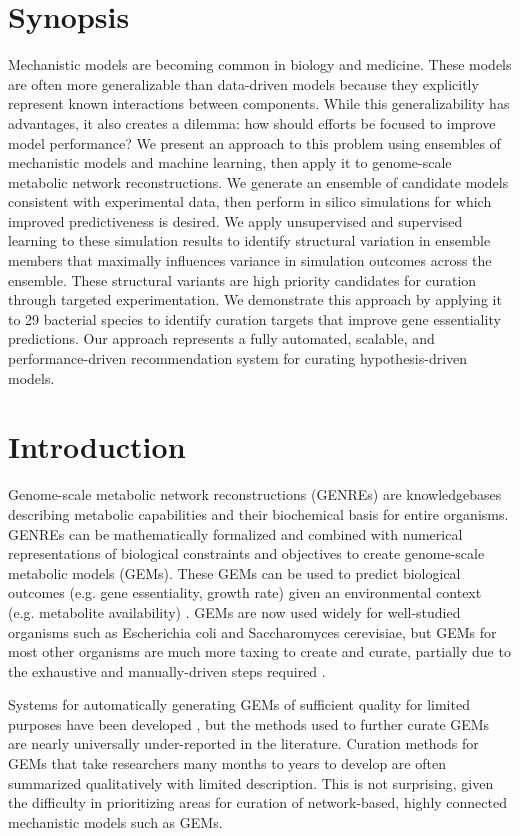 \documentclass[11pt,twocolumn,notitlepage,openany,twoside]{book}
\begin{document}
\begin{refsection}
\section{Synopsis}
Mechanistic models are becoming common in biology and medicine. These models are often more generalizable than data-driven models because they explicitly represent known interactions between components. While this generalizability has advantages, it also creates a dilemma: how should efforts be focused to improve model performance? We present an approach to this problem using ensembles of mechanistic models and machine learning, then apply it to genome-scale metabolic network reconstructions. We generate an ensemble of candidate models consistent with experimental data, then perform in silico simulations for which improved predictiveness is desired. We apply unsupervised and supervised learning to these simulation results to identify structural variation in ensemble members that maximally influences variance in simulation outcomes across the ensemble. These structural variants are high priority candidates for curation through targeted experimentation. We demonstrate this approach by applying it to 29 bacterial species to identify curation targets that improve gene essentiality predictions. Our approach represents a fully automated, scalable, and performance-driven recommendation system for curating hypothesis-driven models.

\section{Introduction}

Genome-scale metabolic network reconstructions (GENREs) are knowledgebases describing metabolic capabilities and their biochemical basis for entire organisms. GENREs can be mathematically formalized and combined with numerical representations of biological constraints and objectives to create genome-scale metabolic models (GEMs). These GEMs can be used to predict biological outcomes (e.g. gene essentiality, growth rate) given an environmental context (e.g. metabolite availability) \cite{Oberhardt2009-iu}. GEMs are now used widely for well-studied organisms such as Escherichia coli and Saccharomyces cerevisiae, but GEMs for most other organisms are much more taxing to create and curate, partially due to the exhaustive and manually-driven steps required \cite{Thiele2010-yq}.

Systems for automatically generating GEMs of sufficient quality for limited purposes have been developed \cite{Henry2010-um}, but the methods used to further curate GEMs are nearly universally under-reported in the literature. Curation methods for GEMs that take researchers many months to years to develop are often summarized qualitatively with limited description. This is not surprising, given the difficulty in prioritizing areas for curation of network-based, highly connected mechanistic models such as GEMs.


\end{refsection}
\end{document}
